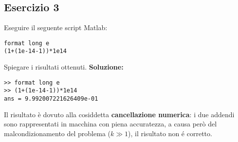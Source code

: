 \subsection{Esercizio 3}
Eseguire il seguente script Matlab:
\begin{lstlisting}
format long e
(1+(1e-14-1))*1e14
\end{lstlisting}
Spiegare i risultati ottenuti.
\newline \textbf{Soluzione:} \newline
\begin{lstlisting}
>> format long e
>> (1+(1e-14-1))*1e14
ans = 9.992007221626409e-01
\end{lstlisting}
Il risultato è dovuto alla cosiddetta \textbf{cancellazione numerica}:
i due addendi sono rappresentati in macchina con piena accuratezza, a causa però del
malcondizionamento del problema ($k \gg 1$), il risultato non é corretto.
